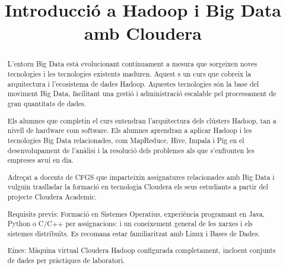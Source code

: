 \documentclass[a4paper]{article}
\begin{document}
\title{Introducció a Hadoop i Big Data amb Cloudera}
\maketitle


%

\begin{comment}
oddsidemargin \the\oddsidemargin \newline
textwidth \the\textwidth \newline
marginparsep \the\marginparsep \newline
marginparwidth \the\marginparwidth \newline
hoffset \the\hoffset \newline
paperwidth \the\paperwidth 
\end{comment}

\begin{abstract}
L’entorn Big Data està evolucionant contínuament a mesura que sorgeixen noves tecnologies i les tecnologies existents maduren. Aquest s un curs que cobreix la arquitectura i l’ecosistema de dades Hadoop. Aquestes tecnologies són la base del moviment Big Data, facilitant una gestió i administració escalable pel processament de gran quantitats de dades.

Els alumnes que completin el curs entendran l’arquitectura dels clústers Hadoop, tan a nivell de hardware com software. Els alumnes aprendran a aplicar Hadoop i les tecnologies Big Data relacionades, com MapReduce, Hive, Impala i Pig en el desenvolupament de l’anàlisi i la resolució dels problemes als que s’enfronten les empreses avui en dia.

Adreçat a docents de CFGS que imparteixin assignatures relacionades amb Big Data i vulguin traslladar la formació en tecnologia Cloudera els seus estudiants a partir del projecte Cloudera Academic.

Requisits previs: Formació en Sistemes Operatius, experiència programant en Java, Python o C/C++ per assignacions: i un coneixement general de les xarxes i els sistemes distribuïts. Es recomana estar familiaritzat amb Linux i Bases de Dades.

Eines: Màquina virtual Cloudera Hadoop configurada completament, incloent conjunts de dades per pràctiques de laboratori.
\end{abstract}
\end{document}
